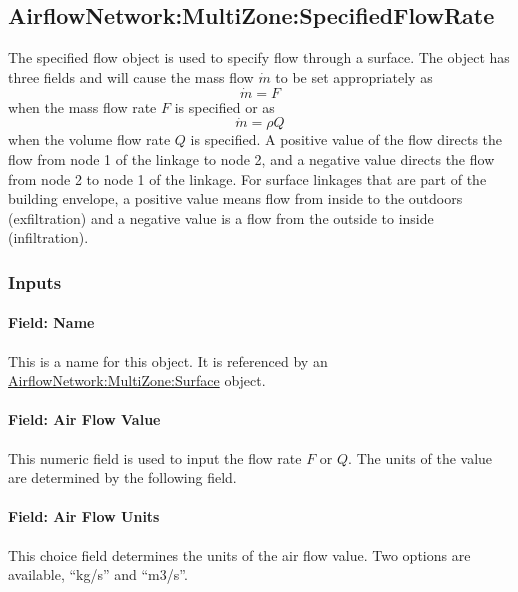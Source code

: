 \subsection{AirflowNetwork:MultiZone:SpecifiedFlowRate}\label{airflownetworkmultizonespecifiedflow}

The specified flow object is used to specify flow through a surface. The object has three fields
and will cause the mass flow $\dot m$ to be set appropriately as 
%
\begin{equation}
\dot m = F
\end{equation}
%
when the mass flow rate $F$ is specified or as 
%
\begin{equation}
\dot m = \rho Q
\end{equation}
%
when the volume flow rate $Q$ is specified. A positive value of the flow directs the flow from node 1
of the linkage to node 2, and a negative value directs the flow from node 2 to node 1 of the linkage. 
For surface linkages that are part of the building envelope, a positive value means flow from inside
to the outdoors (exfiltration) and a negative value is a flow from the outside to inside (infiltration).

\subsubsection{Inputs}\label{inputs-sf}

\paragraph{Field: Name}\label{field-sf-name}

This is a name for this object. It is referenced by an \hyperref[airflownetworkmultizonesurface]{AirflowNetwork:MultiZone:Surface} object.

\paragraph{Field: Air Flow Value}\label{field-sf-air-flow-value}

This numeric field is used to input the flow rate $F$ or $Q$. The units of the value are determined by the following field.

\paragraph{Field: Air Flow Units}\label{field-sf-air-flow-units}

This choice field determines the units of the air flow value. Two options are available, ``kg/s'' and ``m3/s''.

